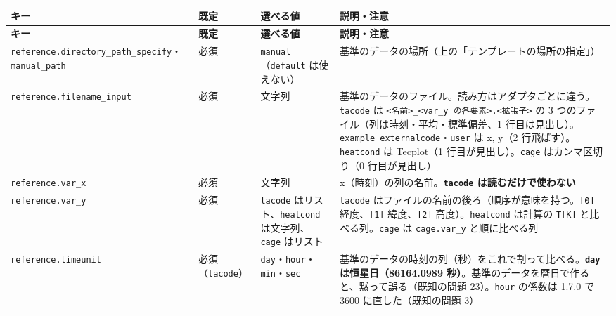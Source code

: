 \begingroup\small
\begin{longtable}{>{\raggedright\arraybackslash}p{}>{\raggedright\arraybackslash}p{}>{\raggedright\arraybackslash}p{}>{\raggedright\arraybackslash}p{}}
\toprule
\textbf{キー} & \textbf{既定} & \textbf{選べる値} & \textbf{説明・注意} \\
\midrule
\endfirsthead
\toprule
\textbf{キー} & \textbf{既定} & \textbf{選べる値} & \textbf{説明・注意} \\
\midrule
\endhead
\bottomrule
\endlastfoot
\texttt{reference.\allowbreak{}directory\_\allowbreak{}path\_\allowbreak{}specify}・\texttt{manual\_\allowbreak{}path} & 必須 & \texttt{manual}（\texttt{default} は使えない） & 基準のデータの場所（上の「テンプレートの場所の指定」） \\
\texttt{reference.\allowbreak{}filename\_\allowbreak{}input} & 必須 & 文字列 & 基準のデータのファイル。読み方はアダプタごとに違う。\texttt{tacode} は \texttt{<名前>\_\allowbreak{}<var\_\allowbreak{}y の各要素>.\allowbreak{}<拡張子>} の 3 つのファイル（列は時刻・平均・標準偏差、1 行目は見出し）。\texttt{example\_\allowbreak{}externalcode}・\texttt{user} は x, y（2 行飛ばす）。\texttt{heatcond} は Tecplot（1 行目が見出し）。\texttt{cage} はカンマ区切り（0 行目が見出し） \\
\texttt{reference.\allowbreak{}var\_\allowbreak{}x} & 必須 & 文字列 & x（時刻）の列の名前。\textbf{\texttt{tacode} は読むだけで使わない} \\
\texttt{reference.\allowbreak{}var\_\allowbreak{}y} & 必須 & \texttt{tacode} はリスト、\texttt{heatcond} は文字列、\texttt{cage} はリスト & \texttt{tacode} はファイルの名前の後ろ（順序が意味を持つ。\texttt{[0]\allowbreak{}} 経度、\texttt{[1]\allowbreak{}} 緯度、\texttt{[2]\allowbreak{}} 高度）。\texttt{heatcond} は計算の \texttt{T[K]\allowbreak{}} と比べる列。\texttt{cage} は \texttt{cage.\allowbreak{}var\_\allowbreak{}y} と順に比べる列 \\
\texttt{reference.\allowbreak{}timeunit} & 必須（\texttt{tacode}） & \texttt{day}・\texttt{hour}・\texttt{min}・\texttt{sec} & 基準のデータの時刻の列（秒）をこれで割って比べる。\textbf{\texttt{day} は恒星日（86164.0989 秒）}。基準のデータを暦日で作ると、黙って誤る（既知の問題 23）。\texttt{hour} の係数は 1.7.0 で 3600 に直した（既知の問題 3） \\
\end{longtable}
\endgroup

